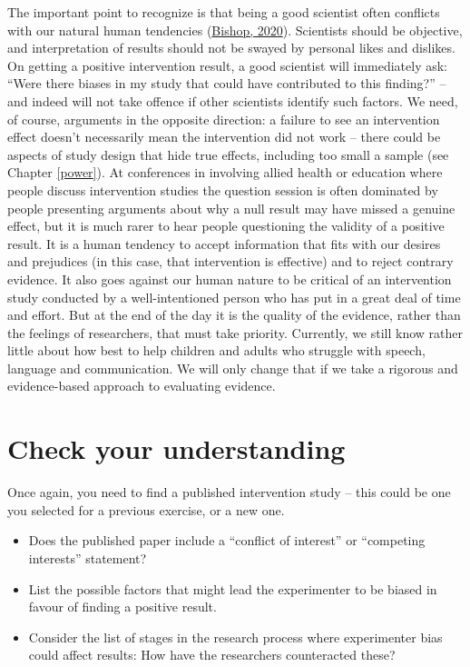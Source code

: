 \documentclass{krantz}
\begin{document}
The important point to recognize is that being a good scientist often conflicts with our natural human tendencies (\protect\hyperlink{ref-bishop2020}{Bishop, 2020}). Scientists should be objective, and interpretation of results should not be swayed by personal likes and dislikes. On getting a positive intervention result, a good scientist will immediately ask: ``Were there biases in my study that could have contributed to this finding?'' -- and indeed will not take offence if other scientists identify such factors. We need, of course, arguments in the opposite direction: a failure to see an intervention effect doesn't necessarily mean the intervention did not work -- there could be aspects of study design that hide true effects, including too small a sample (see Chapter \ref{power}). At conferences in involving allied health or education where people discuss intervention studies the question session is often dominated by people presenting arguments about why a null result may have missed a genuine effect, but it is much rarer to hear people questioning the validity of a positive result. It is a human tendency to accept information that fits with our desires and prejudices (in this case, that intervention is effective) and to reject contrary evidence. It also goes against our human nature to be critical of an intervention study conducted by a well-intentioned person who has put in a great deal of time and effort. But at the end of the day it is the quality of the evidence, rather than the feelings of researchers, that must take priority. Currently, we still know rather little about how best to help children and adults who struggle with speech, language and communication. We will only change that if we take a rigorous and evidence-based approach to evaluating evidence.

\hypertarget{check-your-understanding-7}{%
\section{Check your understanding}\label{check-your-understanding-7}}

Once again, you need to find a published intervention study -- this could be one you selected for a previous exercise, or a new one.

\begin{itemize}
\item
  Does the published paper include a ``conflict of interest'' or ``competing interests'' statement?
\item
  List the possible factors that might lead the experimenter to be biased in favour of finding a positive result.
\item
  Consider the list of stages in the research process where experimenter bias could affect results: How have the researchers counteracted these?
\end{itemize}
\end{document}
